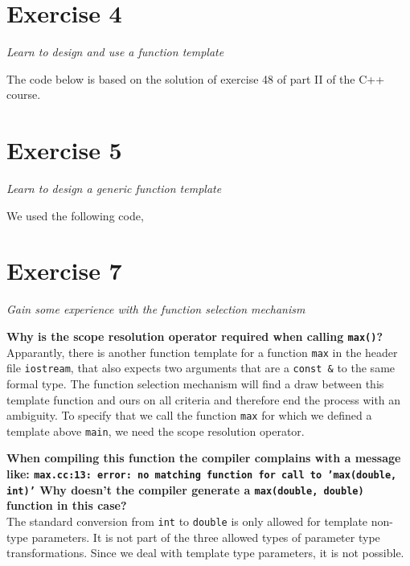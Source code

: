 \documentclass[12pt]{article}
\newcommand{\desc}[1]{\textit{#1} \vspace{1em}}
\begin{document}
\clearpage


\section*{Exercise 4}
\desc{Learn to design and use a function template}

The code below is based on the solution of exercise 48 of part II of the C++ course.






\clearpage

\section*{Exercise 5}
\desc{Learn to design a generic function template}

We used the following code,





\clearpage

\section*{Exercise 7}
\desc{Gain some experience with the function selection mechanism}



\textbf{Why is the scope resolution operator required when calling \texttt{max()}?}\\
Apparantly, there is another function template for a function \texttt{max} in the header file \texttt{iostream}, that also expects two arguments that are a \texttt{const \&} to the same formal type. The function selection mechanism will find a draw between this template function and ours on all criteria and therefore end the process with an ambiguity. To specify that we call the function \texttt{max} for which we defined a template above \texttt{main}, we need the scope resolution operator.

\textbf{When compiling this function the compiler complains with a message like:
\texttt{max.cc:13: error: no matching function for call to 'max(double, int)'}    
Why doesn't the compiler generate a \texttt{max(double, double)} function in this case?}\\
The standard conversion from \texttt{int} to \texttt{double} is only allowed for template non-type parameters. It is not part of the three allowed types of parameter type transformations. Since we deal with template type parameters, it is not possible.
\end{document}
